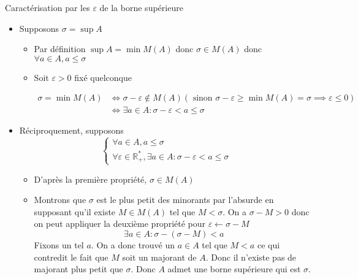 \documentclass{article}
\renewenvironment{question_kholle}[2][ ]
{
	\subsection{\texorpdfstring{#2}{}}
	\notblank{#1}
	{
		\noindent #1
		\bigbreak
	}
	{}
	\begin{proof}
}
{
	\end{proof}
}
\begin{document}
\begin{question_kholle}[{
  Soit $A \in \mathcal{P}(\mathbb{R})$ une partie non vide et majorée.
  Soit $\sigma \in \mathbb{R}$
$$
  \sigma = \sup A \iff \left\{ \begin{array}{ll}
    \forall a \in A, a \leqslant \sigma \\
    \forall \varepsilon \in \mathbb{R}_{+}^{*}, \exists a \in A : \sigma - \varepsilon < a \leqslant \sigma 
  \end{array}\right.
$$
  }]{Caractérisation par les $\varepsilon$ de la borne supérieure}
  
  \begin{itemize}[label = $\star$]
    \item Supposons $\sigma = \sup A$
    \begin{itemize}[label = $\bullet$]
      \item Par définition $\sup A = \min M(A)$ donc $\sigma \in M(A)$ donc $\forall a \in A, a \leqslant \sigma$
      
      \item Soit $\varepsilon >0$ fixé quelconque
      
      \begin{align*}
        \sigma = \min M(A) &\iff \sigma - \varepsilon \not\in M(A) (\text{ sinon } \sigma - \varepsilon \geqslant \min M(A)= \sigma \implies \varepsilon \leqslant 0) \\
        &\iff \exists a \in A: \sigma - \varepsilon < a \leqslant \sigma
      \end{align*} 
      
    \end{itemize}
    
    \item Réciproquement, supposons
$$
    \left\{ \begin{array}{ll}
      \forall a \in A, a \leqslant \sigma \\
      \forall \varepsilon \in \mathbb{R}_{+}^{*}, \exists a \in A : \sigma - \varepsilon < a \leqslant \sigma 
    \end{array}\right.
$$
    \begin{itemize}[label = $\bullet$]
      \item D'après la première propriété, $\sigma \in M(A)$
      \item Montrons que $\sigma$ est le plus petit des minorants par l'absurde en supposant qu'il existe $M \in M(A)$ tel que $M < \sigma$.
      On a $\sigma - M >0$ donc on peut appliquer la deuxième propriété pour $\varepsilon \leftarrow \sigma - M$
$$
      \exists a \in A : \sigma - (\sigma - M )<a 
$$
      Fixons un tel $a$.
      On a donc trouvé un $a \in A$ tel que $M < a$ ce qui contredit le fait que $M$ soit un majorant de $A$.
      Donc il n'existe pas de majorant plus petit que $\sigma$.
      Donc $A$ admet une borne supérieure qui est $\sigma$.
    \end{itemize}
  \end{itemize}
\end{question_kholle}
\end{document}
